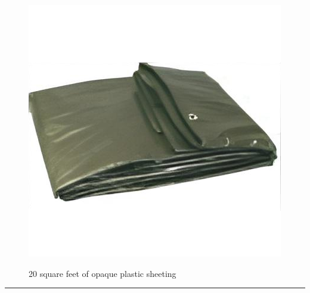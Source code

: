 \documentclass{article}
\begin{document}
    \begin{figure}[H]
        \centering
        \begin{minipage}{0.25\textwidth}
            \centering
            \includegraphics[width=\textwidth]{../SurvivalItemImages/plasticsheeting}
        \end{minipage}\hfill
        \begin{minipage}{0.7\textwidth}
            \centering
            \Large 20 square feet of opaque plastic sheeting
        \end{minipage}
    \end{figure}
    \vspace{-0.8em}
    \noindent\rule{\textwidth}{0.4pt}
            
\end{document}
